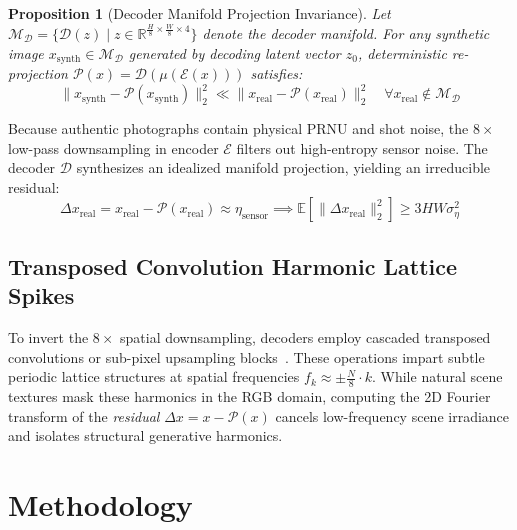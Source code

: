 \documentclass[conference]{IEEEtran}
\newtheorem{proposition}{Proposition}
\begin{document}
\begin{proposition}[Decoder Manifold Projection Invariance]
Let $\mathcal{M}_{\mathcal{D}} = \{ \mathcal{D}(z) \mid z \in \mathbb{R}^{\frac{H}{8} \times \frac{W}{8} \times 4} \}$ denote the decoder manifold. For any synthetic image $x_{\text{synth}} \in \mathcal{M}_{\mathcal{D}}$ generated by decoding latent vector $z_0$, deterministic re-projection $\mathcal{P}(x) = \mathcal{D}(\mu(\mathcal{E}(x)))$ satisfies:
\begin{equation}
\| x_{\text{synth}} - \mathcal{P}(x_{\text{synth}}) \|_2^2 \ll \| x_{\text{real}} - \mathcal{P}(x_{\text{real}}) \|_2^2 \quad \forall x_{\text{real}} \notin \mathcal{M}_{\mathcal{D}}
\end{equation}
\end{proposition}

Because authentic photographs contain physical PRNU and shot noise, the $8\times$ low-pass downsampling in encoder $\mathcal{E}$ filters out high-entropy sensor noise. The decoder $\mathcal{D}$ synthesizes an idealized manifold projection, yielding an irreducible residual:
\begin{equation}
\Delta x_{\text{real}} = x_{\text{real}} - \mathcal{P}(x_{\text{real}}) \approx \eta_{\text{sensor}} \implies \mathbb{E}[\|\Delta x_{\text{real}}\|_2^2] \ge 3HW \sigma_\eta^2
\end{equation}

\subsection{Transposed Convolution Harmonic Lattice Spikes}
To invert the $8\times$ spatial downsampling, decoders employ cascaded transposed convolutions or sub-pixel upsampling blocks~\cite{durall2020watch,frank2020leveraging}. These operations impart subtle periodic lattice structures at spatial frequencies $f_k \approx \pm \frac{N}{8} \cdot k$. While natural scene textures mask these harmonics in the RGB domain, computing the 2D Fourier transform of the \textit{residual} $\Delta x = x - \mathcal{P}(x)$ cancels low-frequency scene irradiance and isolates structural generative harmonics.

\section{Methodology}
\label{sec:method}
\end{document}
